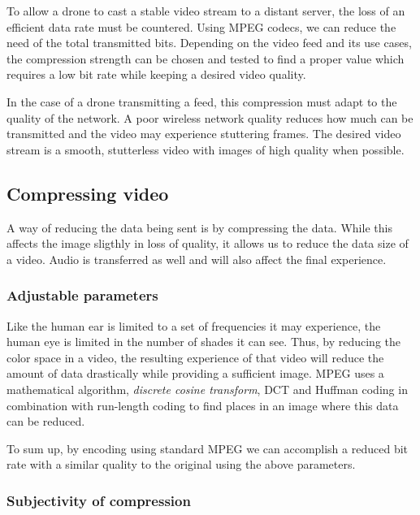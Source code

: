 To allow a drone to cast a stable video stream to a distant server, the loss of an efficient data rate must be countered. Using MPEG codecs, we can reduce the need of the total transmitted bits. Depending on the video feed and its use cases, the compression strength can be chosen and tested to find a proper value which requires a low bit rate while keeping a desired video quality.

In the case of a drone transmitting a feed, this compression must adapt to the quality of the network. A poor wireless network quality reduces how much can be transmitted and the video may experience stuttering frames. The desired video stream is a smooth, stutterless video with images of high quality when possible. 

\subsection{Compressing video}
A way of reducing the data being sent is by compressing the data. While this affects the image sligthly in loss of quality, it allows us to reduce the data size of a video. Audio is transferred as well and will also affect the final experience.

\subsubsection{Adjustable parameters}
Like the human ear is limited to a set of frequencies it may experience, the human eye is limited in the number of shades it can see. Thus, by reducing the color space in a video, the resulting experience of that video will reduce the amount of data drastically while providing a sufficient image. MPEG uses a mathematical algorithm, \textit{discrete cosine transform}, DCT and Huffman coding in combination with run-length coding to find places in an image where this data can be reduced.



To sum up, by encoding using standard MPEG we can accomplish a reduced bit rate with a similar quality to the original using the above parameters.

\subsubsection{Subjectivity of compression}


